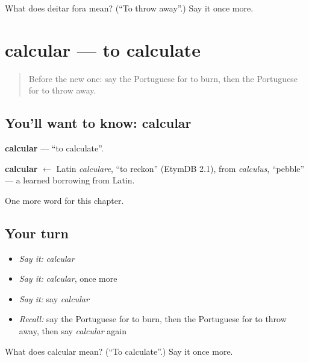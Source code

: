\begin{tcolorbox}[breakable,colback=teal!4,colframe=teal!35!black,title={Before you move on}]
What does deitar fora mean? (\textquotedblleft{}To throw away\textquotedblright{}.) Say it once more.
\end{tcolorbox}
\section[calcular]{calcular — to calculate}

\label{lesson:PT-C204-calcular}



\begin{quote}
Before the new one: say the Portuguese for to burn, then the Portuguese for to throw away.
\end{quote}

\subsection*{You'll want to know: calcular}
\textbf{calcular} — \textquotedblleft{}to calculate\textquotedblright{}.

\begin{cousinweb}
\textbf{calcular} $\leftarrow$ Latin \emph{calculare}, \textquotedblleft{}to reckon\textquotedblright{} (EtymDB 2.1), from \emph{calculus}, \textquotedblleft{}pebble\textquotedblright{} — a learned borrowing from Latin.
\end{cousinweb}

\begin{grammarlens}[title={What you've built}]
One more word for this chapter.
\end{grammarlens}

\subsection*{Your turn}
\begin{itemize}
\raggedright
  \item \emph{Say it:} \emph{calcular}
  \item \emph{Say it:} \emph{calcular}, once more
  \item \emph{Say it:} say \emph{calcular}
  \item \emph{Recall:} say the Portuguese for to burn, then the Portuguese for to throw away, then say \emph{calcular} again
\end{itemize}

\begin{tcolorbox}[breakable,colback=teal!4,colframe=teal!35!black,title={Before you move on}]
What does calcular mean? (\textquotedblleft{}To calculate\textquotedblright{}.) Say it once more.
\end{tcolorbox}
